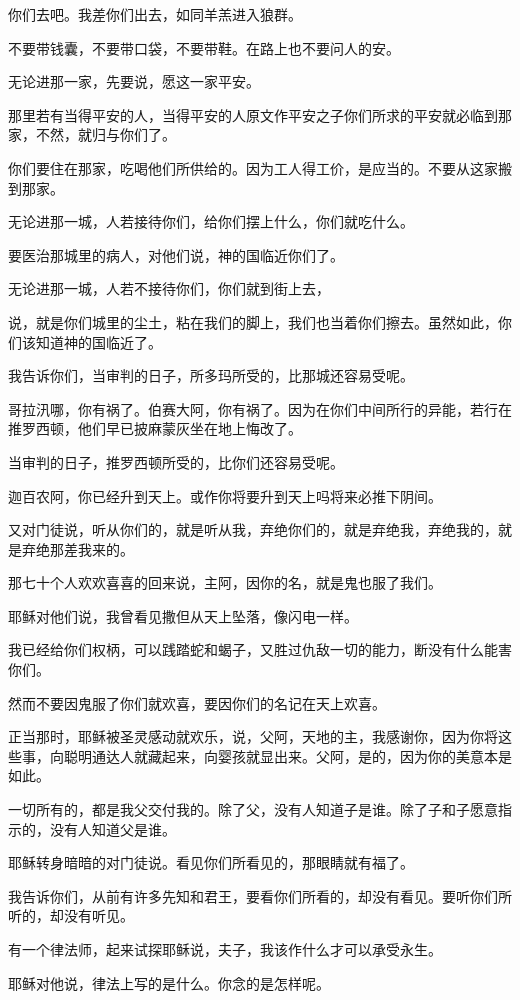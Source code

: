 \documentclass[12pt,oneside]{book}
\begin{document}
你们去吧。我差你们出去，如同羊羔进入狼群。

不要带钱囊，不要带口袋，不要带鞋。在路上也不要问人的安。

无论进那一家，先要说，愿这一家平安。

那里若有当得平安的人，当得平安的人原文作平安之子你们所求的平安就必临到那家，不然，就归与你们了。

你们要住在那家，吃喝他们所供给的。因为工人得工价，是应当的。不要从这家搬到那家。

无论进那一城，人若接待你们，给你们摆上什么，你们就吃什么。

要医治那城里的病人，对他们说，神的国临近你们了。

无论进那一城，人若不接待你们，你们就到街上去，

说，就是你们城里的尘土，粘在我们的脚上，我们也当着你们擦去。虽然如此，你们该知道神的国临近了。

我告诉你们，当审判的日子，所多玛所受的，比那城还容易受呢。

哥拉汛哪，你有祸了。伯赛大阿，你有祸了。因为在你们中间所行的异能，若行在推罗西顿，他们早已披麻蒙灰坐在地上悔改了。

当审判的日子，推罗西顿所受的，比你们还容易受呢。

迦百农阿，你已经升到天上。或作你将要升到天上吗将来必推下阴间。

又对门徒说，听从你们的，就是听从我，弃绝你们的，就是弃绝我，弃绝我的，就是弃绝那差我来的。

那七十个人欢欢喜喜的回来说，主阿，因你的名，就是鬼也服了我们。

耶稣对他们说，我曾看见撒但从天上坠落，像闪电一样。

我已经给你们权柄，可以践踏蛇和蝎子，又胜过仇敌一切的能力，断没有什么能害你们。

然而不要因鬼服了你们就欢喜，要因你们的名记在天上欢喜。

正当那时，耶稣被圣灵感动就欢乐，说，父阿，天地的主，我感谢你，因为你将这些事，向聪明通达人就藏起来，向婴孩就显出来。父阿，是的，因为你的美意本是如此。

一切所有的，都是我父交付我的。除了父，没有人知道子是谁。除了子和子愿意指示的，没有人知道父是谁。

耶稣转身暗暗的对门徒说。看见你们所看见的，那眼睛就有福了。

我告诉你们，从前有许多先知和君王，要看你们所看的，却没有看见。要听你们所听的，却没有听见。

有一个律法师，起来试探耶稣说，夫子，我该作什么才可以承受永生。

耶稣对他说，律法上写的是什么。你念的是怎样呢。
\end{document}
